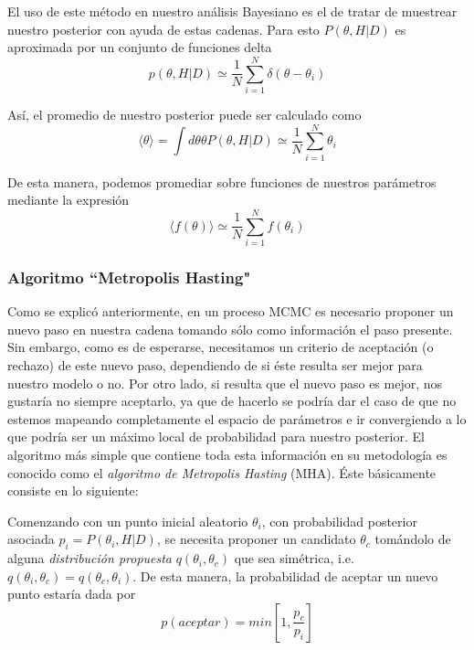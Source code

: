 \documentclass[10.5pt,prb,
               showpacs,            %
               preprintnumbers,     %
               aps,                 %
               prl,          	    %
               letterpaper,             %
               superscriptaddress,      %
               nofootinbib,         %
               tightenlines,        %
               floats,floatfix      %
               ,usenatbib]{revtex4-1}%
\begin{document}
El uso de este m\'etodo en nuestro an\'alisis Bayesiano es el de tratar de muestrear nuestro 
posterior con ayuda de estas cadenas. Para esto $P(\theta,H|D)$ es aproximada por un conjunto de funciones delta
%
	\begin{equation}
		p(\theta,H|D)\simeq \frac{1}{N}\sum_{i=1}^N \delta(\theta-\theta_i)
	\end{equation}

\noindent
As\'i, el promedio de nuestro posterior puede ser calculado como 
%
	\begin{equation}
		\langle\theta\rangle=\int d\theta \theta P(\theta,H|D)\simeq \frac{1}{N}\sum_{i=1}^N\theta_i
	\end{equation}

\noindent
De esta manera, podemos promediar sobre funciones de nuestros par\'ametros mediante la expresi\'on 
%
	\begin{equation}
	\langle f(\theta)\rangle \simeq\frac{1}{N}\sum_{i=1}^N f(\theta_i)
	\end{equation}


\subsubsection{Algoritmo ``Metropolis Hasting"}

Como se explic\'o anteriormente, en un proceso MCMC es necesario proponer un nuevo 
paso en nuestra cadena tomando s\'olo como informaci\'on el paso presente. Sin embargo, 
como es de esperarse, necesitamos un criterio de aceptaci\'on (o rechazo) de este nuevo paso, 
dependiendo de si \'este resulta ser mejor para nuestro modelo o no. Por otro lado, si resulta 
que el nuevo paso es mejor, nos gustar\'ia no siempre aceptarlo, ya que de hacerlo se podr\'ia 
dar el caso de que no estemos mapeando completamente el espacio de par\'ametros e ir 
convergiendo a lo que podr\'ia ser un m\'aximo local de probabilidad para nuestro posterior. 
El algoritmo m\'as simple que contiene toda esta informaci\'on en su metodolog\'ia es conocido 
como el \textit{algoritmo de Metropolis Hasting} (MHA). \'Este b\'asicamente 
consiste en lo siguiente:

\noindent
 Comenzando con un punto inicial aleatorio $\theta_i$, con probabilidad 
posterior asociada $p_i = P(\theta_i,H|D)$, se necesita proponer un candidato $\theta_c$ tom\'andolo 
de alguna \textit{distribuci\'on propuesta} $q(\theta_i,\theta_c)$ que sea sim\'etrica, i.e. $q(\theta_i,\theta_c)=
q(\theta_c,\theta_i)$. De esta manera, la probabilidad de aceptar un nuevo punto estar\'ia dada por 
%
	\begin{equation}
		p(aceptar)=min\left[1,\frac{p_c}{p_i}\right]
	\end{equation}
\end{document}
